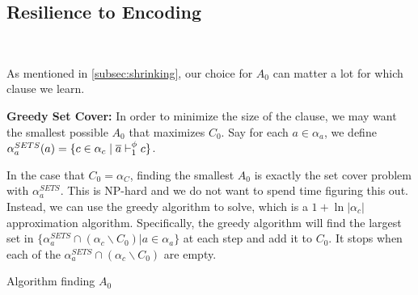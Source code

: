 \subsection{Resilience to Encoding}~\label{subsec:sym}

As mentioned in \autoref{subsec:shrinking}, our choice for $A_0$ can matter a lot for which clause we learn. 




\noindent \textbf{Greedy Set Cover:} %
In order to minimize the size of the clause, we may want the smallest possible $A_0$ that maximizes $C_0$. Say for each $a \in \alpha_a$, we define $\alpha_a^{SETS}(a) = \{ c \in \alpha_c \; | \; \overline{a} \vdash_1^\phi c\}$. 

In the case that $C_0 = \alpha_C$, finding the smallest $A_0$ is exactly the set cover problem with $\alpha_a^{SETS}$. This is NP-hard and we do not want to spend time figuring this out. Instead, we can use the greedy algorithm to solve, which is a $1 + \ln |\alpha_c|$ approximation algorithm. Specifically, the greedy algorithm will find the largest set in $\{\alpha_a^{SETS} \cap (\alpha_c \backslash C_0) | a \in \alpha_a \}$ at each step and add it to $C_0$. It stops when each of the $\alpha_a^{SETS} \cap (\alpha_c \backslash C_0)$ are empty.


\begin{algorithm}
    \caption{Algorithm finding $A_0$}\label{alg:finda0}
    \SetAlgoNoLine

\end{algorithm}

